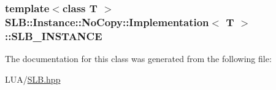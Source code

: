 \subsubsection[{\texorpdfstring{S\+L\+B\+\_\+\+I\+N\+S\+T\+A\+N\+CE}{SLB_INSTANCE}}]{\setlength{\rightskip}{0pt plus 5cm}template$<$class T $>$ {\bf S\+L\+B\+::\+Instance\+::\+No\+Copy\+::\+Implementation}$<$ T $>$\+::S\+L\+B\+\_\+\+I\+N\+S\+T\+A\+N\+CE\hspace{0.3cm}{\ttfamily [protected]}}\hypertarget{classSLB_1_1Instance_1_1NoCopy_1_1Implementation_aece7c6c65e09643db706b01d086446c6}{}\label{classSLB_1_1Instance_1_1NoCopy_1_1Implementation_aece7c6c65e09643db706b01d086446c6}


The documentation for this class was generated from the following file\+:\begin{DoxyCompactItemize}
\item 
L\+U\+A/\hyperlink{SLB_8hpp}{S\+L\+B.\+hpp}\end{DoxyCompactItemize}
